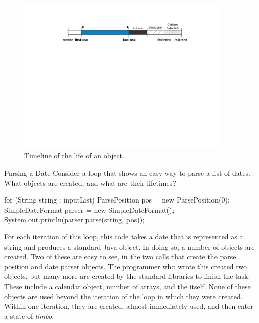 \begin{figure}
	\includegraphics[width=0.9\textwidth]{part4/Figures/lifetime/object-lifecycle}
	\caption{Timeline of the life of an object.}
	\label{fig:typical-lifecycle}
\end{figure}

\begin{example}{Parsing a Date} Consider a loop that shows an easy way to parse
a list of dates. What objects are created, and what are their lifetimes?
\begin{shortlisting}
for (String string : inputList) {
	ParsePosition pos = new ParsePosition(0);
	SimpleDateFormat parser = new SimpleDateFormat();
	System.out.println(parser.parse(string, pos));
}
\end{shortlisting}
\end{example}

For each iteration of this loop, this code takes a date that is represented as a
string and produces a standard Java  object. In doing so, a number of
objects are created. Two of these are easy to see, in the two  calls
that create the parse position and date parser objects. The programmer who wrote
this created two objects, but many more are created by the standard libraries to
finish the task. These include a calendar object, number of arrays, and the
 itself. None of these objects are used beyond the iteration of the
loop in which they were created. Within one iteration, they are created, almost
immediately used, and then enter a state of \emph{limbo}.


